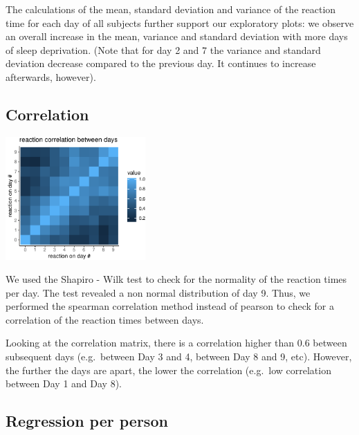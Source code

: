 \documentclass[
]{article}
\begin{document}
The calculations of the mean, standard deviation and variance of the
reaction time for each day of all subjects further support our
exploratory plots: we observe an overall increase in the mean, variance
and standard deviation with more days of sleep deprivation. (Note that
for day 2 and 7 the variance and standard deviation decrease compared to
the previous day. It continues to increase afterwards, however).

\hypertarget{correlation}{%
\subsection{Correlation}\label{correlation}}

\begin{center}\includegraphics[width=0.4\textwidth]{common_sleep_files/figure-latex/spearman_tile-1} \end{center}

We used the Shapiro - Wilk test to check for the normality of the
reaction times per day. The test revealed a non normal distribution of
day 9. Thus, we performed the spearman correlation method instead of
pearson to check for a correlation of the reaction times between days.

Looking at the correlation matrix, there is a correlation higher than
0.6 between subsequent days (e.g.~between Day 3 and 4, between Day 8 and
9, etc). However, the further the days are apart, the lower the
correlation (e.g.~low correlation between Day 1 and Day 8).

\hypertarget{regression-per-person}{%
\subsection{Regression per person}\label{regression-per-person}}
\end{document}
